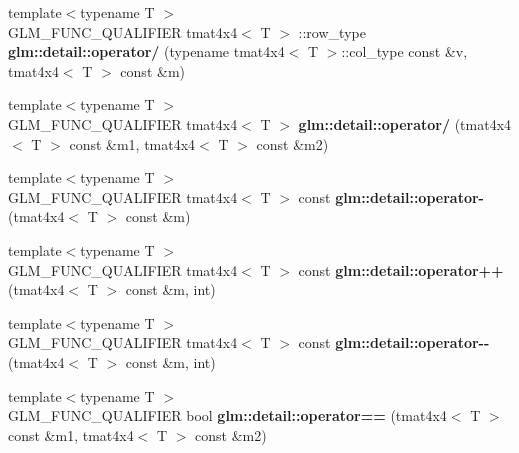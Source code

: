 \begin{DoxyCompactItemize}
\item 
\hypertarget{namespaceglm_1_1detail_aec04bbab896710a238403f28ee25c7f7}{{\footnotesize template$<$typename T $>$ }\\\-G\-L\-M\-\_\-\-F\-U\-N\-C\-\_\-\-Q\-U\-A\-L\-I\-F\-I\-E\-R tmat4x4$<$ \-T $>$\*
\-::row\-\_\-type {\bfseries glm\-::detail\-::operator/} (typename tmat4x4$<$ \-T $>$\-::col\-\_\-type const \&v, tmat4x4$<$ \-T $>$ const \&m)}\label{namespaceglm_1_1detail_aec04bbab896710a238403f28ee25c7f7}

\item 
\hypertarget{namespaceglm_1_1detail_aef28094878813f4a07e17ab4b9e76272}{{\footnotesize template$<$typename T $>$ }\\\-G\-L\-M\-\_\-\-F\-U\-N\-C\-\_\-\-Q\-U\-A\-L\-I\-F\-I\-E\-R tmat4x4$<$ \-T $>$ {\bfseries glm\-::detail\-::operator/} (tmat4x4$<$ \-T $>$ const \&m1, tmat4x4$<$ \-T $>$ const \&m2)}\label{namespaceglm_1_1detail_aef28094878813f4a07e17ab4b9e76272}

\item 
\hypertarget{namespaceglm_1_1detail_af5e7bbe52d8f7c5cb5a317b616cdaf2c}{{\footnotesize template$<$typename T $>$ }\\\-G\-L\-M\-\_\-\-F\-U\-N\-C\-\_\-\-Q\-U\-A\-L\-I\-F\-I\-E\-R tmat4x4$<$ \-T $>$\*
 const {\bfseries glm\-::detail\-::operator-\/} (tmat4x4$<$ \-T $>$ const \&m)}\label{namespaceglm_1_1detail_af5e7bbe52d8f7c5cb5a317b616cdaf2c}

\item 
\hypertarget{namespaceglm_1_1detail_aa5e18871374b599d72761351699cd204}{{\footnotesize template$<$typename T $>$ }\\\-G\-L\-M\-\_\-\-F\-U\-N\-C\-\_\-\-Q\-U\-A\-L\-I\-F\-I\-E\-R tmat4x4$<$ \-T $>$\*
 const {\bfseries glm\-::detail\-::operator++} (tmat4x4$<$ \-T $>$ const \&m, int)}\label{namespaceglm_1_1detail_aa5e18871374b599d72761351699cd204}

\item 
\hypertarget{namespaceglm_1_1detail_af0e5b1193ec997b1c8f366521b727e25}{{\footnotesize template$<$typename T $>$ }\\\-G\-L\-M\-\_\-\-F\-U\-N\-C\-\_\-\-Q\-U\-A\-L\-I\-F\-I\-E\-R tmat4x4$<$ \-T $>$\*
 const {\bfseries glm\-::detail\-::operator-\/-\/} (tmat4x4$<$ \-T $>$ const \&m, int)}\label{namespaceglm_1_1detail_af0e5b1193ec997b1c8f366521b727e25}

\item 
\hypertarget{namespaceglm_1_1detail_a3c172feec00f7d940e4acea842841699}{{\footnotesize template$<$typename T $>$ }\\\-G\-L\-M\-\_\-\-F\-U\-N\-C\-\_\-\-Q\-U\-A\-L\-I\-F\-I\-E\-R bool {\bfseries glm\-::detail\-::operator==} (tmat4x4$<$ \-T $>$ const \&m1, tmat4x4$<$ \-T $>$ const \&m2)}\label{namespaceglm_1_1detail_a3c172feec00f7d940e4acea842841699}


\end{DoxyCompactItemize}
